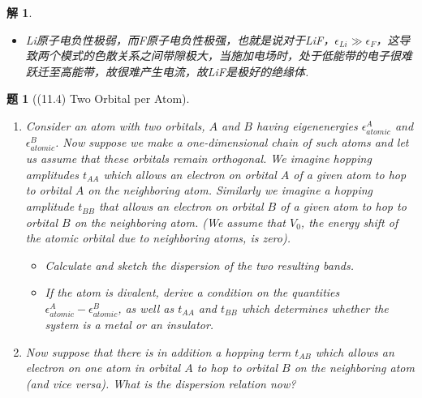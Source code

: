 \documentclass[UTF8,10pt,a4paper]{article}
\theoremstyle{Problem}
\newtheorem{prob}{题}
\theoremstyle{Solution}
\newtheorem*{sol}{解}
\begin{document}
\begin{sol}
\begin{itemize}
        (2) 若$\epsilon_A$和$\epsilon_B$有较小的差异，即带隙很小，则若需要产生电流，需要先消耗部分能量将电子激发到高能带上，此时系统为\underline{半导体}.\\
        (3) 若$\epsilon_A$和$\epsilon_B$之差很大，即带隙很大，则电子很难跃迁到高能带上而导电，此时系统为\underline{绝缘体}.
        \item[$\triangleright$] Li原子电负性极弱，而F原子电负性极强，也就是说对于LiF，$\epsilon_{Li}\gg\epsilon_{F}$，这导致两个模式的色散关系之间带隙极大，当施加电场时，处于低能带的电子很难跃迁至高能带，故很难产生电流，故LiF是极好的绝缘体.
    \end{itemize}
\end{sol}

\begin{prob}[(11.4) Two Orbital per Atom]
    \begin{enumerate}
        \item[(a)] Consider an atom with two orbitals, $A$ and $B$ having eigenenergies $\epsilon_{atomic}^A$ and $\epsilon_{atomic}^B$. Now suppose we make a one-dimensional chain of such atoms and let us assume that these orbitals remain orthogonal. We imagine hopping amplitudes $t_{AA}$ which allows an electron on orbital $A$ of a given atom to hop to orbital $A$ on the neighboring atom. Similarly we imagine a hopping amplitude $t_{BB}$ that allows an electron on orbital $B$ of a given atom to hop to orbital $B$ on the neighboring atom. (We assume that $V_0$, the energy shift of the atomic orbital due to neighboring atoms, is zero).
	\begin{itemize}
	    \item[$\triangleright$] Calculate and sketch the dispersion of the two resulting bands.
	    \item[$\triangleright$] If the atom is divalent, derive a condition on the quantities $\epsilon_{atomic}^A-\epsilon_{atomic}^B$, as well as $t_{AA}$ and $t_{BB}$ which determines whether the system is a metal or an insulator.
	\end{itemize}
	\item[(b)$^*$] Now suppose that there is in addition a hopping term $t_{AB}$ which allows an electron on one atom in orbital $A$ to hop to orbital $B$ on the neighboring atom  (and vice versa). What is the dispersion relation now?
    \end{enumerate}
\end{prob}
\end{document}
